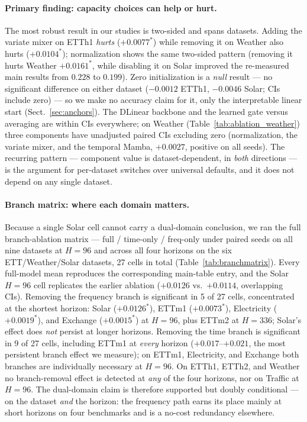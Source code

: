 \documentclass[runningheads]{llncs}
\begin{document}
\paragraph{Primary finding: capacity choices can help or hurt.} The most
robust result in our studies is two-sided and spans datasets. Adding the
variate mixer on ETTh1 \emph{hurts} ($+0.0077^{*}$) while removing it on
Weather also hurts ($+0.0104^{*}$); normalization shows the same two-sided
pattern (removing it hurts Weather $+0.0161^{*}$, while disabling it on Solar
improved the re-measured main results from $0.228$ to $0.199$). Zero
initialization is a \emph{null} result --- no significant difference on
either dataset ($-0.0012$ ETTh1, $-0.0046$ Solar; CIs include zero) --- so
we make no accuracy claim for it, only the interpretable linear start
(Sect.~\ref{sec:anchors}). The DLinear backbone and the learned gate versus
averaging are within CIs everywhere; on Weather
(Table~\ref{tab:ablation_weather}) three components have unadjusted paired
CIs excluding zero (normalization, the variate mixer, and the temporal Mamba,
$+0.0027$, positive on all seeds). The recurring pattern --- component value
is dataset-dependent, in \emph{both} directions --- is the argument for
per-dataset switches over universal defaults, and it does not depend on any
single dataset.

\paragraph{Branch matrix: where each domain matters.} Because a single
Solar cell cannot carry a dual-domain conclusion, we ran the full
branch-ablation matrix --- full / time-only / freq-only under paired seeds
on all nine datasets at $H{=}96$ and across all four horizons on the six
ETT/Weather/Solar datasets, 27 cells in total
(Table~\ref{tab:branchmatrix}). Every full-model mean reproduces the
corresponding main-table entry, and the Solar $H{=}96$ cell replicates the
earlier ablation ($+0.0126$ vs.\ $+0.0114$, overlapping CIs). Removing the
frequency branch is significant in 5 of 27 cells, concentrated at the
shortest horizon: Solar ($+0.0126^{*}$), ETTm1 ($+0.0073^{*}$),
Electricity ($+0.0019^{*}$), and Exchange ($+0.0015^{*}$) at $H{=}96$,
plus ETTm2 at $H{=}336$; Solar's effect does \emph{not} persist at longer
horizons. Removing the time branch is significant in 9 of 27 cells,
including ETTm1 at \emph{every} horizon ($+0.017$--$+0.021$, the most
persistent branch effect we measure); on ETTm1, Electricity, and Exchange
both branches are individually necessary at $H{=}96$. On ETTh1, ETTh2, and
Weather no branch-removal effect is detected at \emph{any} of the four
horizons, nor on Traffic at $H{=}96$. The dual-domain claim is therefore
supported but doubly conditional --- on the dataset \emph{and} the
horizon: the frequency path earns its place mainly at short horizons on
four benchmarks and is a no-cost redundancy elsewhere.
\end{document}
